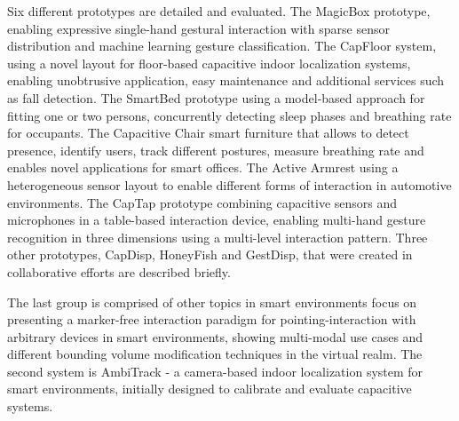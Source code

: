 Six different prototypes are detailed and evaluated. The MagicBox prototype, enabling expressive single-hand gestural interaction with sparse sensor distribution and machine learning gesture classification. The CapFloor system, using a novel layout for floor-based capacitive indoor localization systems, enabling unobtrusive application, easy maintenance and additional services such as fall detection. The SmartBed prototype using a model-based approach for fitting one or two persons, concurrently detecting sleep phases and breathing rate for occupants. The Capacitive Chair smart furniture that allows to detect presence, identify users, track different postures, measure breathing rate and enables novel applications for smart offices. The Active Armrest using a heterogeneous sensor layout to enable different forms of interaction in automotive environments. The CapTap prototype combining capacitive sensors and microphones in a table-based interaction device, enabling multi-hand gesture recognition in three dimensions using a multi-level interaction pattern. Three other prototypes, CapDisp, HoneyFish and GestDisp, that were created in collaborative efforts are described briefly.

The last group is comprised of other topics in smart environments focus on presenting a marker-free interaction paradigm for pointing-interaction with arbitrary devices in smart environments, showing multi-modal use cases and different bounding volume modification techniques in the virtual realm. The second system is AmbiTrack - a camera-based indoor localization system for smart environments, initially designed to calibrate and evaluate capacitive systems.


